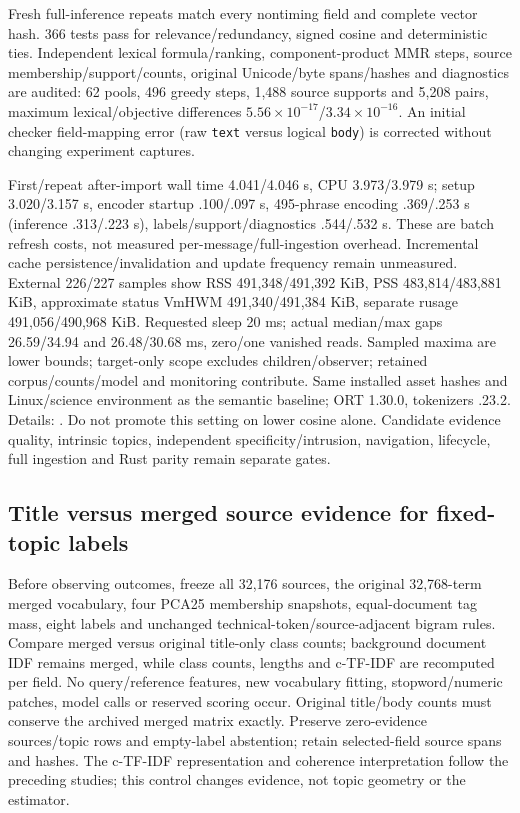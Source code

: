 \documentclass[11pt]{article}
\begin{document}
Fresh full-inference repeats match every nontiming field and complete vector hash.
366 tests pass for relevance/redundancy, signed cosine and deterministic ties.
Independent lexical formula/ranking, component-product MMR steps, source
membership/support/counts, original Unicode/byte spans/hashes and diagnostics
are audited: 62 pools, 496 greedy steps, 1,488 source supports and 5,208 pairs,
maximum lexical/objective differences $5.56\times10^{-17}$/$3.34\times10^{-16}$.
An initial checker field-mapping error (raw \texttt{text} versus
logical \texttt{body}) is corrected without changing experiment captures.

First/repeat after-import wall time 4.041/4.046 s, CPU 3.973/3.979 s;
setup 3.020/3.157 s, encoder startup .100/.097 s, 495-phrase encoding
.369/.253 s (inference .313/.223 s), labels/support/diagnostics .544/.532 s.
These are batch refresh costs, not measured per-message/full-ingestion overhead.
Incremental cache persistence/invalidation and update frequency remain unmeasured.
External 226/227 samples show RSS 491,348/491,392 KiB, PSS 483,814/483,881 KiB,
approximate status VmHWM 491,340/491,384 KiB, separate rusage 491,056/490,968 KiB.
Requested sleep 20 ms; actual median/max gaps 26.59/34.94 and 26.48/30.68 ms,
zero/one vanished reads. Sampled maxima are lower bounds; target-only scope excludes
children/observer; retained corpus/counts/model and monitoring contribute.
Same installed asset hashes and Linux/science environment as the semantic baseline;
ORT 1.30.0, tokenizers .23.2. Details: .
Do not promote this setting on lower cosine alone. Candidate evidence quality,
intrinsic topics, independent specificity/intrusion, navigation, lifecycle,
full ingestion and Rust parity remain separate gates.

\subsection{Title versus merged source evidence for fixed-topic labels}
Before observing outcomes, freeze all 32,176 sources, the original 32,768-term
merged vocabulary, four PCA25 membership snapshots, equal-document tag mass,
eight labels and unchanged technical-token/source-adjacent bigram rules.
Compare merged versus original title-only class counts; background document IDF
remains merged, while class counts, lengths and c-TF-IDF are recomputed per field.
No query/reference features, new vocabulary fitting, stopword/numeric patches,
model calls or reserved scoring occur. Original title/body counts must conserve
the archived merged matrix exactly. Preserve zero-evidence sources/topic rows
and empty-label abstention; retain selected-field source spans and hashes.
The c-TF-IDF representation and coherence interpretation follow the preceding
studies; this control changes evidence, not topic geometry or the estimator.
\end{document}
